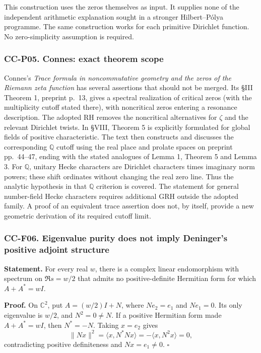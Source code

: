 \documentclass[11pt,a4paper]{article}
\theoremstyle{definition}\newtheorem{definition}[theorem]{Definition}
\theoremstyle{remark}\newtheorem{remark}[theorem]{Remark}
\begin{document}
This construction uses the zeros themselves as input. It supplies none
of the independent arithmetic explanation sought in a stronger
Hilbert--Pólya programme. The same construction works for each primitive
Dirichlet function. No zero-simplicity assumption is required.

\subsubsection{CC-P05. Connes: exact theorem
scope}\label{cc-p05.-connes-exact-theorem-scope}

Connes's \emph{Trace formula in noncommutative geometry and the zeros of
the Riemann zeta function} has several assertions that should not be
merged. Its §III Theorem 1, preprint p.~13, gives a spectral realization
of critical zeros (with the multiplicity cutoff stated there), with
noncritical zeros entering a resonance description. The adopted RH
removes the noncritical alternatives for \(\zeta\) and the relevant
Dirichlet twists. In §VIII, Theorem 5 is explicitly formulated for
global fields of positive characteristic. The text then constructs and
discusses the corresponding \(\mathbb Q\) cutoff using the real place
and prolate spaces on preprint pp.~44--47, ending with the stated
analogues of Lemma 1, Theorem 5 and Lemma 3. For \(\mathbb Q\), unitary
Hecke characters are Dirichlet characters times imaginary norm powers;
these shift ordinates without changing the real zero line. Thus the
analytic hypothesis in that \(\mathbb Q\) criterion is covered. The
statement for general number-field Hecke characters requires additional
GRH outside the adopted family. A proof of an equivalent trace assertion
does not, by itself, provide a new geometric derivation of its required
cutoff limit.

\subsubsection{CC-F06. Eigenvalue purity does not imply Deninger's
positive adjoint
structure}\label{cc-f06.-eigenvalue-purity-does-not-imply-deningers-positive-adjoint-structure}

\textbf{Statement.} For every real \(w\), there is a complex linear
endomorphism with spectrum on \(\Re s=w/2\) that admits no
positive-definite Hermitian form for which \(A+A^*=wI\).

\textbf{Proof.} On \(\mathbb C^2\), put \(A=(w/2)I+N\), where
\(Ne_2=e_1\) and \(Ne_1=0\). Its only eigenvalue is \(w/2\), and
\(N^2=0\ne N\). If a positive Hermitian form made \(A+A^*=wI\), then
\(N^*=-N\). Taking \(x=e_2\) gives \[
 \|Nx\|^2=\langle x,N^*Nx\rangle
          =-\langle x,N^2x\rangle=0,
\] contradicting positive definiteness and \(Nx=e_1\ne0\). \(\square\)
\end{document}
